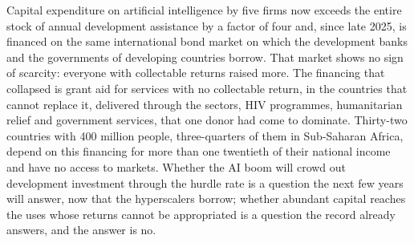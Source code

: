 \documentclass[AER]{AEA}
\begin{document}
Capital expenditure on artificial intelligence by five firms now exceeds the entire stock of annual development assistance by a factor of four and, since late 2025, is financed on the same international bond market on which the development banks and the governments of developing countries borrow. That market shows no sign of scarcity: everyone with collectable returns raised more. The financing that collapsed is grant aid for services with no collectable return, in the countries that cannot replace it, delivered through the sectors, HIV programmes, humanitarian relief and government services, that one donor had come to dominate. Thirty-two countries with 400 million people, three-quarters of them in Sub-Saharan Africa, depend on this financing for more than one twentieth of their national income and have no access to markets. Whether the AI boom will crowd out development investment through the hurdle rate is a question the next few years will answer, now that the hyperscalers borrow; whether abundant capital reaches the uses whose returns cannot be appropriated is a question the record already answers, and the answer is no.



\end{document}
